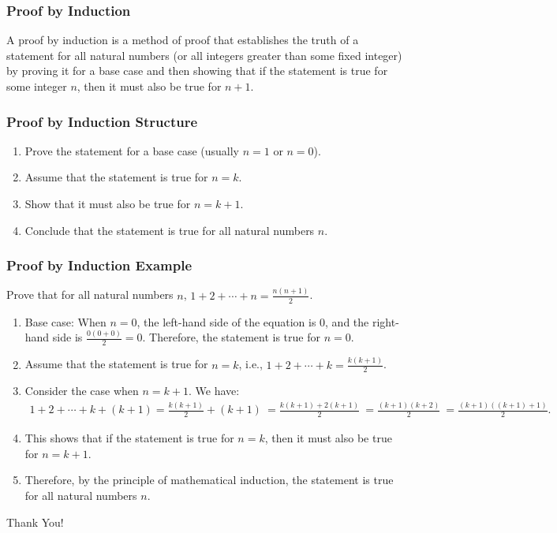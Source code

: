 \documentclass{beamer}
\begin{document}
\begin{frame}
\frametitle{Proof by Induction}
A proof by induction is a method of proof that establishes the truth of a statement for all natural numbers (or all integers greater than some fixed integer) by proving it for a base case and then showing that if the statement is true for some integer $n$, then it must also be true for $n+1$.
\end{frame}

\begin{frame}
\frametitle{Proof by Induction Structure}
\begin{enumerate}
    \item<1-> Prove the statement for a base case (usually $n=1$ or $n=0$).
    \pause
    \item<2-> Assume that the statement is true for $n=k$.
    \pause
    \item<3-> Show that it must also be true for $n=k+1$.
    \pause
    \item<4-> Conclude that the statement is true for all natural numbers $n$.
\end{enumerate}
\end{frame}

{\small
\begin{frame}
\frametitle{Proof by Induction Example}
Prove that for all natural numbers $n$, $1+2+\cdots+n=\frac{n(n+1)}{2}$.
\pause
\begin{enumerate}
    \item<1-> Base case: When $n=0$, the left-hand side of the equation is $0$, and the right-hand side is $\frac{0(0+0)}{2}=0$. Therefore, the statement is true for $n=0$.
    \pause
    \item<2-> Assume that the statement is true for $n=k$, i.e., $1+2+\cdots+k=\frac{k(k+1)}{2}$.
    \pause
    \item<3-> Consider the case when $n=k+1$. We have:
    {\tiny\
    \begin{align*}
    1+2+\cdots+k+(k+1) = \frac{k(k+1)}{2}+(k+1) \
    = \frac{k(k+1)+2(k+1)}{2} \
    = \frac{(k+1)(k+2)}{2} \
    = \frac{(k+1)((k+1)+1)}{2}.
    \end{align*}
    }
    \pause
    \item<4-> This shows that if the statement is true for $n=k$, then it must also be true for $n=k+1$.
    \pause
    \item<5-> Therefore, by the principle of mathematical induction, the statement is true for all natural numbers $n$.
\end{enumerate}

\end{frame}
}

\begin{frame}
\centering
\Huge Thank You!
\end{frame}
\end{document}
